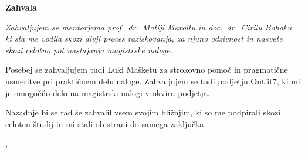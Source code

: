 \thispagestyle{empty}

\begin{center}
{\Large \textbf{\sc Zahvala}}
\end{center}
\vspace{0.5cm}

{\it\noindent
Zahvaljujem se mentorjema prof.~dr.\ Matiji Maroltu in doc.~dr.\ Cirilu Bohaku, ki sta me vodila skozi divji proces raziskovanja, za njuno odzivnost in nasvete skozi celotno pot nastajanja magistrske naloge.

Posebej se zahvaljujem tudi Luki Mašketu za strokovno pomoč in pragmatične usmeritve pri praktičnem delu naloge. Zahvaljujem se tudi podjetju Outfit7, ki mi je omogočilo delo na magistrski nalogi v okviru podjetja.

Nazadnje bi se rad še zahvalil vsem svojim bližnjim, ki so me podpirali skozi celoten študij in mi stali ob strani do samega zaključka.

\vspace{0.5cm} \hfill \tauthor, \myyear
}